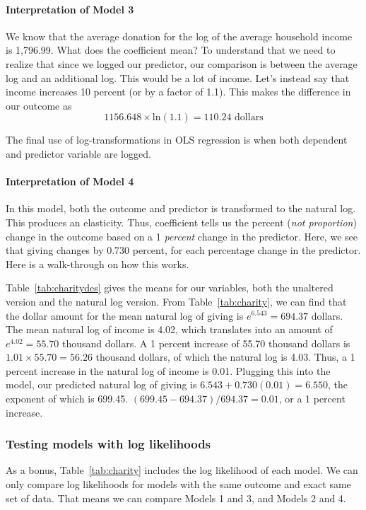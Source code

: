 \paragraph{Interpretation of Model 3}

We know that the average donation for the log of the average household income is 1,796.99. What does the coefficient mean? To understand that we need to realize that since we logged our predictor, our comparison is between the average log and an additional log. This would be a lot of income. Let's instead say that income increases 10 percent (or by a factor of 1.1). This makes the difference in our outcome as
\[
1156.648\times\mbox{ln}\left(1.1\right)=110.24 \mbox{ dollars}
\]

The final use of log-transformations in OLS regression is when both dependent and predictor variable are logged.

\paragraph{Interpretation of Model 4}

In this model, both the outcome and predictor is transformed to the natural log. This produces an elasticity. Thus, coefficient tells us the percent ({\it not proportion}) change in the outcome based on a 1 {\it percent} change in the predictor. Here, we see that giving changes by 0.730 percent, for each percentage change in the predictor. Here is a walk-through on how this works.

Table~\ref{tab:charitydes} gives the means for our variables, both the unaltered version and the natural log version. From Table~\ref{tab:charity}, we can find that the dollar amount for the mean natural log of giving is $e^{6.543}=694.37$ dollars. The mean natural log of income is 4.02, which translates into an amount of $e^{4.02}=55.70$ thousand dollars. A 1 percent increase of 55.70 thousand dollars is $1.01\times55.70 = 56.26$ thousand dollars, of which the natural log is 4.03. Thus, a 1 percent increase in the natural log of income is 0.01. Plugging this into the model, our predicted natural log of giving is $6.543+0.730\left(0.01\right)=6.550$, the exponent of which is 699.45. $\left(699.45 - 694.37\right)/694.37=0.01$, or a 1 percent increase.

\subsubsection{Testing models with log likelihoods}
\label{sec:likelihoodtest}
As a bonus, Table~\ref{tab:charity} includes the log likelihood of each model. We can only compare log likelihoods for models with the same outcome and exact same set of data. That means we can compare Models 1 and 3, and Models 2 and 4.

